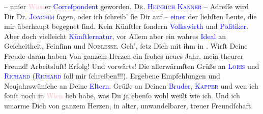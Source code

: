                – unſer \textcolor{pink}{Wien}{}\ledrightnote{\textcolor{pink}{Wien}}er \textcolor{blue}{Correſpondent}{} geworden. \textsc{Dr. \textcolor{blue}{Heinrich Kanner}{}\ledrightnote{\textcolor{blue}{Heinrich Kanner}}} – Adreſſe wird Dir Dr. \textsc{\textcolor{blue}{Joachim}{}\ledrightnote{\textcolor{blue}{Jaques Joachim}}} ſagen, oder ich ſchreib’ ſie Dir auf – \textcolor{blue}{einer}{} der liebſten Leute, die mir überhaupt be{\pb}gegnet ſind. Kein Künſtler ſondern \textcolor{blue}{Volkswirth}{} und \textcolor{blue}{Politiker}{}. Aber doch vielleicht \textcolor{blue}{Künſtlernatur}{}, vor Allem aber
               ein wahres \textcolor{blue}{Ideal}{} an
               Geſcheitheit, Feinſinn und \textsc{Noblesse}. Geh’, ſetz Dich mit
               ihm in \label{K_L02704-10v}\label{K_L02704-10h}. Wirſt
               Deine Freude daran haben{\dotsfive}\pend
           \pstart
           Von ganzem Herzen ein frohes neues Jahr, mein theurer Freund! {\pb}Arbeitsluſt! Erfolg! Und vorwärts! Die allerwärmſten
               Grüße an \textsc{\textcolor{blue}{Loris}{}\ledrightnote{\textcolor{blue}{Hugo von Hofmannsthal}}} und \textsc{\textcolor{blue}{Richard}{}\ledrightnote{\textcolor{blue}{Richard Beer-Hofmann}}} (\textsc{\textcolor{blue}{Richard}{}\ledrightnote{\textcolor{blue}{Richard Beer-Hofmann}}} ſoll mir ſchreiben!!!). Ergebene Empfehlungen und Neujahrswünſche an Deine \textcolor{blue}{Eltern}{}. Grüße an
               Deinen \textcolor{blue}{Bruder}{}, \textsc{\textcolor{blue}{Kapper}{}\ledrightnote{\textcolor{blue}{Friedrich Kapper}}} und wen ich ſonſt noch in \textcolor{pink}{Wien}{}\ledrightnote{\textcolor{pink}{Wien}} lieb habe,
               was Du ja ebenſo wohl weißt wie ich.\pend
           \pstart
           Und ich umarme Dich von ganzem Herzen, {\pb}in alter,
               unwandelbarer, treuer Freundſchaft.\pend
